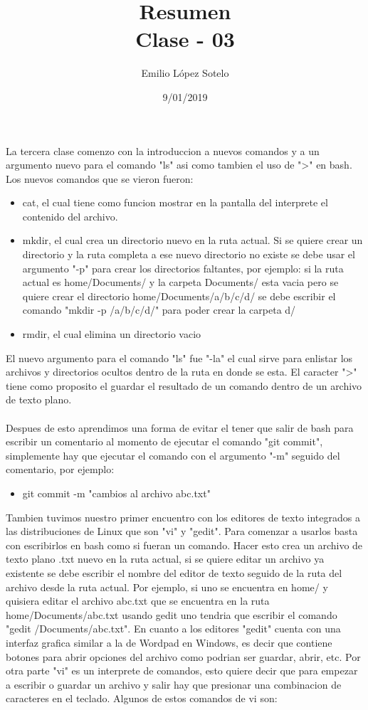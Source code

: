 \documentclass[letterpaper, 12pt, oneside]{article}
\title{Resumen\\Clase - 03}
\author{Emilio López Sotelo}
\date{9/01/2019}
\begin{document}
	\maketitle
	La tercera clase comenzo con la introduccion a nuevos comandos y a un argumento nuevo para el comando "ls" asi como tambien el uso de ">" en bash. Los nuevos comandos que se vieron fueron:
	\begin{itemize}
		\item cat, el cual tiene como funcion mostrar en la pantalla del interprete el contenido del archivo.
		\item mkdir, el cual crea un directorio nuevo en la ruta actual. Si se quiere crear un directorio y la ruta completa a ese nuevo directorio no existe se debe usar el argumento "-p" para crear los directorios faltantes, por ejemplo: si la ruta actual es home/Documents/ y la carpeta Documents/ esta vacia pero se quiere crear el directorio home/Documents/a/b/c/d/ se debe escribir el comando "mkdir -p /a/b/c/d/" para poder crear la carpeta d/
		\item rmdir, el cual elimina un directorio vacio
	\\
	\end{itemize}
	El nuevo argumento para el comando "ls" fue "-la" el cual sirve para enlistar los archivos y directorios ocultos dentro de la ruta en donde se esta. El caracter ">" tiene como proposito el guardar el resultado de un comando dentro de un archivo de texto plano.
	\\
	\\
	Despues de esto aprendimos una forma de evitar el tener que salir de bash para escribir un comentario al momento de ejecutar el comando "git commit", simplemente hay que ejecutar el comando con el argumento "-m" seguido del comentario, por ejemplo:
	\begin{itemize}
		\item git commit -m "cambios al archivo abc.txt"
	\\
	\end{itemize}
	Tambien tuvimos nuestro primer encuentro con los editores de texto integrados a las distribuciones de Linux que son "vi" y "gedit". Para comenzar a usarlos basta con escribirlos en bash como si fueran un comando. Hacer esto crea un archivo de texto plano .txt nuevo en la ruta actual, si se quiere editar un archivo ya existente se debe escribir el nombre del editor de texto seguido de la ruta del archivo desde la ruta actual. Por ejemplo, si uno se encuentra en home/ y quisiera editar el archivo abc.txt que se encuentra en la ruta home/Documents/abc.txt usando gedit uno tendria que escribir el comando "gedit /Documents/abc.txt". En cuanto a los editores "gedit" cuenta con una interfaz grafica similar a la de Wordpad en Windows, es decir que contiene botones para abrir opciones del archivo como podrian ser guardar, abrir, etc. Por otra parte "vi" es un interprete de comandos, esto quiere decir que para empezar a escribir o guardar un archivo y salir hay que presionar una combinacion de caracteres en el teclado. Algunos de estos comandos de vi son:
\end{document}
